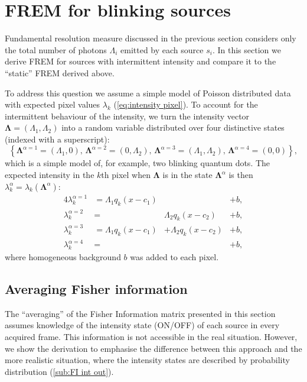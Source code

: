 
\section{FREM for blinking sources\label{sec:FREM for blinking}}

Fundamental resolution measure discussed in the previous section considers only the total number of photons $\Lambda_i$ emitted by each source $s_i$. In this section we derive FREM for sources with intermittent intensity and compare it to the ``static'' FREM derived above. 

To address this question we assume a simple model of Poisson distributed data with expected pixel values $\lambda_k$ (\autoref{eq:intensity pixel}). To account for the intermittent behaviour of the intensity, we turn the intensity vector $\bm{\Lambda}=(\Lambda_1,\Lambda_2)$ into a random variable distributed over four distinctive states (indexed with a superscript):
%
\begin{equation}
	\left\{ \bm{\Lambda}^{\alpha=1}=(\Lambda_1,0),\,\bm{\Lambda}^{\alpha=2}=(0,\Lambda_2),\,\bm{\Lambda}^{\alpha=3}=(\Lambda_1,\Lambda_2),\,\bm{\Lambda}^{\alpha=4}=(0,0)\right\},
	\label{eq:intensity states}
\end{equation}
%
which is a simple model of, for example, two blinking quantum dots. The expected intensity in the $k$th pixel when $\bm{\Lambda}$ is in the state $\bm{\Lambda}^\alpha$ is then $\lambda_k^\alpha=\lambda_k(\bm{\Lambda}^\alpha)$:
%
\begin{alignat}{4}
	\lambda_k^{\alpha=1}&=\Lambda_1q_k(x-c_1) & &+b,\nonumber\\ 
	\lambda_k^{\alpha=2}&=&\Lambda_2q_k(x-c_2) &+b,\nonumber\\ 
	\lambda_k^{\alpha=3}&=\Lambda_1q_k(x-c_1)&+\Lambda_2q_k(x-c_2)&+b,\nonumber\\ 
	\lambda_k^{\alpha=4}&=& &+b,
	\label{eq:lambda states}
\end{alignat}
%
where homogeneous background $b$ was added to each pixel.

\subsection{Averaging Fisher information\label{sub:avg FI}}

The ``averaging'' of the Fisher Information matrix presented in this section assumes knowledge of the intensity state (ON/OFF) of each source in every acquired frame. This information is not accessible in the real situation. However, we show the derivation to emphasise the difference between this approach and the more realistic situation, where the intensity states are described by probability distribution (\autoref{sub:FI int out}). 

